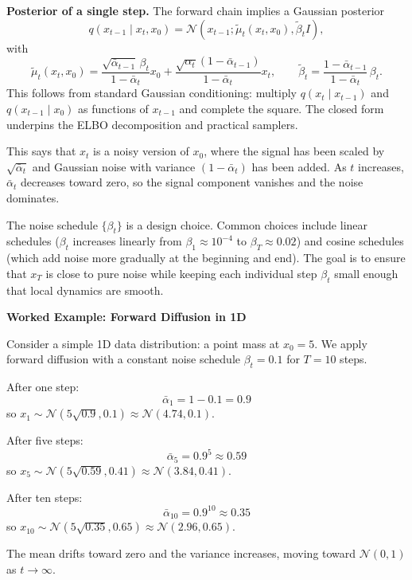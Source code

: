 \vspPara

\textbf{Posterior of a single step.} The forward chain implies a Gaussian posterior
$$q(x_{t-1}\mid x_t,x_0)=\mathcal{N}\!\left(x_{t-1};\tilde{\mu}_t(x_t,x_0),\tilde{\beta}_t I\right),$$
with
$$\tilde{\mu}_t(x_t,x_0)=\frac{\sqrt{\bar{\alpha}_{t-1}}\,\beta_t}{1-\bar{\alpha}_t}x_0 + \frac{\sqrt{\alpha_t}(1-\bar{\alpha}_{t-1})}{1-\bar{\alpha}_t}x_t, \qquad \tilde{\beta}_t=\frac{1-\bar{\alpha}_{t-1}}{1-\bar{\alpha}_t}\,\beta_t.$$
This follows from standard Gaussian conditioning: multiply $q(x_t\mid x_{t-1})$ and $q(x_{t-1}\mid x_0)$ as functions of $x_{t-1}$ and complete the square. The closed form underpins the ELBO decomposition and practical samplers.

\vspPara

This says that $x_t$ is a noisy version of $x_0$, where the signal has been scaled by $\sqrt{\bar{\alpha}_t}$ and Gaussian noise with variance $(1 - \bar{\alpha}_t)$ has been added. As $t$ increases, $\bar{\alpha}_t$ decreases toward zero, so the signal component vanishes and the noise dominates.
\vspPara

The noise schedule $\{\beta_t\}$ is a design choice. Common choices include linear schedules ($\beta_t$ increases linearly from $\beta_1 \approx 10^{-4}$ to $\beta_T \approx 0.02$) and cosine schedules (which add noise more gradually at the beginning and end). The goal is to ensure that $x_T$ is close to pure noise while keeping each individual step $\beta_t$ small enough that local dynamics are smooth.

\vspSection

\begin{examplebox}
\textbf{Worked Example: Forward Diffusion in 1D}

Consider a simple 1D data distribution: a point mass at $x_0 = 5$. We apply forward diffusion with a constant noise schedule $\beta_t = 0.1$ for $T = 10$ steps.

After one step:
%
\begin{equation*}
\bar{\alpha}_1 = 1 - 0.1 = 0.9
\end{equation*}
%
so $x_1 \sim \mathcal{N}(5 \sqrt{0.9}, 0.1) \approx \mathcal{N}(4.74, 0.1)$.

After five steps:
%
\begin{equation*}
\bar{\alpha}_5 = 0.9^5 \approx 0.59
\end{equation*}
%
so $x_5 \sim \mathcal{N}(5 \sqrt{0.59}, 0.41) \approx \mathcal{N}(3.84, 0.41)$.

After ten steps:
%
\begin{equation*}
\bar{\alpha}_{10} = 0.9^{10} \approx 0.35
\end{equation*}
%
so $x_{10} \sim \mathcal{N}(5 \sqrt{0.35}, 0.65) \approx \mathcal{N}(2.96, 0.65)$.

The mean drifts toward zero and the variance increases, moving toward $\mathcal{N}(0,1)$ as $t \to \infty$.
\end{examplebox}

